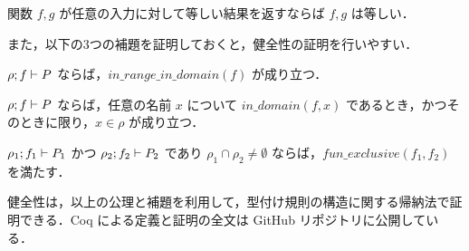 \begin{axm}[関数の外延的同値]
  関数 $ f, g $ が任意の入力に対して等しい結果を返すならば $ f, g $ は等しい．
\end{axm}




また，以下の3つの補題を証明しておくと，健全性の証明を行いやすい．


\begin{lem}[定義域と値域の一致]
  \label{lemma:typing_range_domain}
  $\rho ; f \vdash P$ ならば，$in\_range\_in\_domain(f)$ が成り立つ．
\end{lem}

\begin{lem}
  \label{lemma:typing_recep_domain}
  $\rho ; f \vdash P$ ならば，任意の名前 $ x $ について $in\_domain(f, x) $ であるとき，かつそのときに限り，$ x \in \rho $ が成り立つ．
\end{lem}

\begin{lem}
  \label{lemma:typing_fun_exclusive}
  $\rho_1 ; f_1 \vdash P_1$ かつ $\rho_2 ; f_2 \vdash P_2$ であり $ \rho_1 \cap \rho_2 \neq \emptyset $ ならば，$fun\_exclusive(f_1, f_2)$ を満たす．
\end{lem}

健全性は，以上の公理と補題を利用して，型付け規則の構造に関する帰納法で証明できる．Coq による定義と証明の全文は GitHub リポジトリ\cite[api]{api}に公開している．







